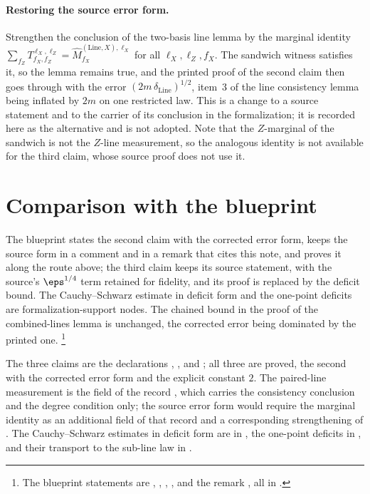 \documentclass[11pt]{article}
\begin{document}
\paragraph{Restoring the source error form.}
Strengthen the conclusion of the two-basis line lemma by the marginal
identity $\sum_{f_Z} T^{\ell_X,\ell_Z}_{f_X,f_Z} =
\hat{M}^{(\mathrm{Line},X),\ell_X}_{f_X}$ for all $\ell_X, \ell_Z, f_X$.
The sandwich witness satisfies it, so the lemma remains true, and the
printed proof of the second claim then goes through with the error
$(2m\,\delta_{\mathrm{Line}})^{1/2}$, item~3 of the line consistency lemma
being inflated by $2m$ on one restricted law.  This is a change to a source
statement and to the carrier of its conclusion in the formalization; it is
recorded here as the alternative and is not adopted.  Note that the
$Z$-marginal of the sandwich is not the $Z$-line measurement, so the
analogous identity is not available for the third claim, whose source proof
does not use it.

\section{Comparison with the blueprint}

The blueprint \cite{MIPStarREBlueprint} states the second claim with the
corrected error form, keeps the source form in a comment and in a remark
that cites this note, and proves it along the route above; the third claim
keeps its source statement, with the source's $\eps^{1/4}$ term retained
for fidelity, and its proof is replaced by the deficit bound.  The
Cauchy--Schwarz estimate in deficit form and the one-point deficits are
formalization-support nodes.  The chained bound in the proof of the
combined-lines lemma is unchanged, the corrected error being dominated by
the printed one.%
\footnote{The blueprint statements are ,
, ,
, and the remark
, all in
.}

The three claims are the declarations
,
, and
; all three are proved,
the second with the corrected error form and the explicit constant $2$.
The paired-line measurement is the field of the record
, which carries the
consistency conclusion and the degree condition only; the source error
form would require the marginal identity as an additional field of that
record and a corresponding strengthening of .  The
Cauchy--Schwarz estimates in deficit form are in
, the one-point deficits in
, and their transport to
the sub-line law in .
\end{document}
